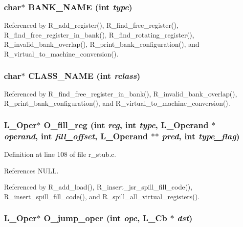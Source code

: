 \subsubsection{\setlength{\rightskip}{0pt plus 5cm}char$\ast$ BANK\_\-NAME (int {\em type})}\label{r__regalloc_8h_051a7ad6a6187411dc94287c4383706f}




Referenced by R\_\-add\_\-register(), R\_\-find\_\-free\_\-register(), R\_\-find\_\-free\_\-register\_\-in\_\-bank(), R\_\-find\_\-rotating\_\-register(), R\_\-invalid\_\-bank\_\-overlap(), R\_\-print\_\-bank\_\-configuration(), and R\_\-virtual\_\-to\_\-machine\_\-conversion().
\subsubsection{\setlength{\rightskip}{0pt plus 5cm}char$\ast$ CLASS\_\-NAME (int {\em rclass})}\label{r__regalloc_8h_4a0dc00a9c54e0e914a7cddc0d2f76c9}




Referenced by R\_\-find\_\-free\_\-register\_\-in\_\-bank(), R\_\-invalid\_\-bank\_\-overlap(), R\_\-print\_\-bank\_\-configuration(), and R\_\-virtual\_\-to\_\-machine\_\-conversion().
\subsubsection{\setlength{\rightskip}{0pt plus 5cm}L\_\-Oper$\ast$ O\_\-fill\_\-reg (int {\em reg}, int {\em type}, L\_\-Operand $\ast$ {\em operand}, int {\em fill\_\-offset}, L\_\-Operand $\ast$$\ast$ {\em pred}, int {\em type\_\-flag})}\label{r__regalloc_8h_9f7d468e025a4f50218cb5c0927aac50}




Definition at line 108 of file r\_\-stub.c.

References NULL.

Referenced by R\_\-add\_\-load(), R\_\-insert\_\-jsr\_\-spill\_\-fill\_\-code(), R\_\-insert\_\-spill\_\-fill\_\-code(), and R\_\-spill\_\-all\_\-virtual\_\-registers().
\subsubsection{\setlength{\rightskip}{0pt plus 5cm}L\_\-Oper$\ast$ O\_\-jump\_\-oper (int {\em opc}, L\_\-Cb $\ast$ {\em dst})}\label{r__regalloc_8h_53073d2eacf19a4e5ef57ef8afb9db59}




